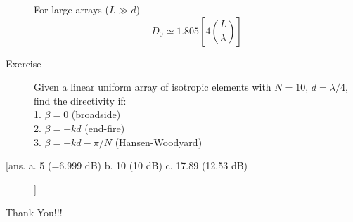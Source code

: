 \documentclass{beamer}
\begin{document}
	\begin{frame}
		\begin{description}
			\item[]For large arrays ($ L\gg d $)
			\begin{equation}
			D_0 \simeq 1.805\left[4\left(\frac{L}{\lambda}\right)\right]
			\end{equation}
			\item[Exercise] Given a linear uniform array of isotropic elements with $ N = 10 $, $ d =\lambda/4 $, find the directivity if:\\
			1. $ \beta = 0 $ (broadside)\\
			2. $ \beta = −kd $ (end-fire)\\
			3. $ \beta = −kd − \pi/N $ (Hansen-Woodyard)\\
			\item[[ans. a. 5 (=6.999 dB) b. 10 (10 dB) c. 17.89 (12.53 dB)]] 
		\end{description}
	\end{frame}
	
	\begin{frame}
		\Huge{\centerline{Thank You!!!}}
	\end{frame}
\end{document}
